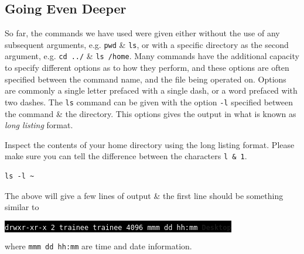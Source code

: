 \documentclass[a4paper,12pt,twoside]{memoir}
\begin{document}
\subsection{Going Even Deeper}
\begin{information}
So far, the commands we have used were given either without the use of any subsequent arguments, e.g. \texttt{pwd} \& \texttt{ls}, or with a specific directory as the second argument, e.g. \texttt{cd ../} \& \texttt{ls /home}.
Many commands have the additional capacity to specify different options as to how they perform, and these options are often specified between the command name, and the file being operated on.
Options are commonly a single letter prefaced with a single dash, or a word prefaced with two dashes.
The \texttt{ls} command can be given with the option \texttt{-l} specified between the command \& the directory.
This options gives the output in what is known as \textit{long listing} format. \\
\end{information}

\begin{steps}
Inspect the contents of your home directory using the long listing format. 
Please make sure you can tell the difference between the characters \texttt{l \& 1}.\\
\begin{lstlisting}
ls -l ~
\end{lstlisting}
\end{steps}

The above will give a few lines of output \& the first line should be something similar to
\begin{center}
\colorbox{black}{\texttt{\textcolor{white}{drwxr-xr-x 2 trainee trainee 4096 mmm dd hh:mm} \textcolor{light-blue}{\textbf{Desktop}}}}\\
\end{center}
where \texttt{mmm dd hh:mm} are time and date information.\\
\end{document}
